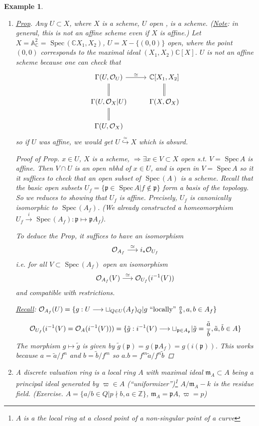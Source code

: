 \documentclass[11pt]{article}
\newtheorem{ex}[thm]{Example}
\newcommand{\spec}{\text{ Spec}\,}
\newcommand{\affn}{\mathbb A}
\newcommand{\cplx}{\mathbb C}
\newcommand{\intg}{\mathbb Z}
\newcommand{\scm}{{\mathfrak m}}
\newcommand{\scp}{{\mathfrak p}}
\newcommand{\calo}{{\cal O}}
\newcommand{\Lrta}{\Longrightarrow}
\newcommand{\lrta}{\longrightarrow}
\newcommand{\inj}{\hookrightarrow}
\begin{document}
\begin{ex}
\begin{enumerate}[label=(\arabic*)]
\underline{Check} $V\subset U\subset X\Lrta f|V=(f|U)|V$.
\item \underline{Prop}. Any $U\subset X$, where $X$ is a scheme, $U$ open , is a scheme. 
(\underline{Note}: in general, this is not an affine  scheme even if $X$ is affine.)
Let $X=\affn^2_\cplx=\spec(\cplx{X_1,X_2})$, $U=X-\{(0,0)\}$ open, where the point $(0,0)$ corresponds to the maximal ideal $(X_1,X_2)\cplx[X]$. $U$ is not  an affine scheme because one can check that 
$$
\begin{tikzcd}
\Gamma(U,\calo_U) \arrow[d, equal] \arrow[r, "\simeq"] & \cplx[X_1,X_2] \arrow[d,equal] \\
\Gamma(U,\calo_X|U) \arrow[d,equal] & \Gamma(X,\calo_X) \\
\Gamma(U,\calo_X) & 
\end{tikzcd}
$$
 so if $U$ was affine, we would get $U\overset{\simeq}{\inj} X$ which is absurd.
\begin{proof}[Proof of Prop]
$x\in U$, $X$ is a scheme, $\Lrta \exists x\in V\subset X$ open s.t. $V=\spec A$ is affine. Then $V\cap U$ is an open nbhd of $x\in U$, and is  open in $V=\spec A$ so it it suffices to check that an open subset of $\spec(A)$ is a scheme. Recall that the basic open subsets $U_f=\{\scp\in \spec A|f\notin \scp\}$ form a basis of the topology. So we reduces to showing that  $U_f$ is affine. Precisely, $U_f$ is canonically isomorphic to $\spec(A_f)$. (We already constructed a homeomorphism $U_f\overset{i}{\lrta} \spec(A_f): \scp\mapsto \scp A_f$).

To deduce the Prop, it suffices to have an isomorphism 
$$
\calo_{A_f}\overset{\simeq}{\lrta} i_*\calo_{U_f}
$$
i.e. for all $V\subset \spec (A_f)$ open an isomorphism 
$$
\calo_{A_f}(V)\overset{\simeq }{\lrta} \calo_{U_f}(i^{-1}(V))
$$
and compatible with restrictions.

\underline{Recall}: $\calo_{A_f}(U)=\{g:U\lrta \sqcup_{Q\in U}(A_f)_Q|g\text{ ``locally'' } \frac{a}{b}, a,b\in A_f\} $

$$
\calo_{U_f}(i^{-1}(V)=\calo_A(i^{-1}(V)))=\{\tilde{g}: i^{-1}(V)\lrta \sqcup_{\scp \in A_{\scp}}|\tilde{g}=\frac{\tilde{a}}{\tilde{b}}, \tilde{a},\tilde{b}\in A\}
$$
The morphism $g\mapsto \tilde{g}$ is given by $\tilde{g}(\scp)=g(\scp A_f)=g(i(\scp))$. This works because $a=\tilde{a}/f^n$ and $b=\tilde{b}/f^m$ so $a.b=f^m\tilde{a}/f^n\tilde{b}$
\end{proof}
\item A discrete valuation ring is a local ring $A$ with maximal ideal $\scm_A\subset A$ being a principal ideal generated by $\varpi\in A$ (``uniformizer'')\footnote{$A$ is a the local ring at a closed point of  a non-singular point of a curve}
$A/\scm_A-k$ is the residue field. (Exercise. $A=\{a/b\in Q|p\nmid b,a\in \intg\}$, $\scm_A=\scp A,\varpi =p$)


\end{enumerate}
\end{ex}
\end{document}
